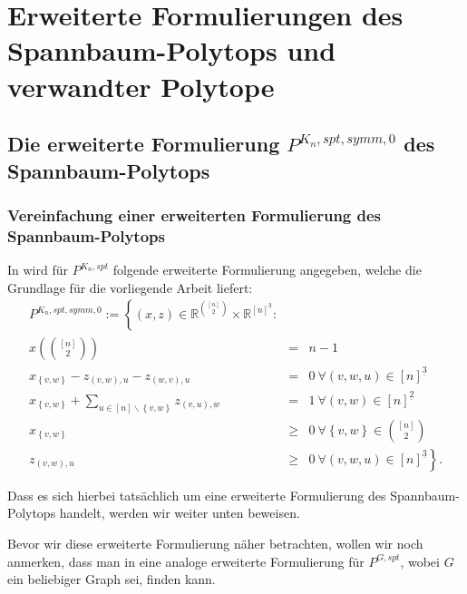\documentclass[10p,a4paper,BCOR = 12mm, DIV=15]{scrbook}
\begin{document}
\part{Erweiterte Formulierungen des Spannbaum-Polytops und verwandter Polytope}

\label{part:spannbaum_polytop}

\chapter{Die erweiterte Formulierung $P^{K_n, spt, symm, 0}$ des Spannbaum-Polytops}

\section{Vereinfachung einer erweiterten Formulierung des Spannbaum-Polytops}

In \cite{optima:ext_form_comb_opt} wird für $P^{K_n, spt}$ folgende erweiterte Formulierung angegeben, welche die Grundlage für die vorliegende Arbeit liefert:
\begin{eqnarray}
P^{K_n, spt, symm, 0} := \left\{(x, z)\in\mathbb{R}^{[n]\choose 2}\times \mathbb{R}^{[n]^{\underline{3}}}:\right. & & \nonumber \\
x\left({\left[n\right] \choose 2}\right) & = & n-1 \label{eq:spt1_redundant_1} \\
x_{\left\{v, w\right\}} - z_{\left(v, w\right), u} - z_{\left(w, v\right), u} & = & 0\ \forall \left(v, w, u\right)\in [n]^{\underline{3}} \label{eq:spt1_redundant_2} \\
x_{\left\{v, w\right\}} + \sum_{u\in[n]\backslash\left\{v, w\right\}} z_{\left(v, u\right), w} & = & 1\ \forall \left(v, w\right)\in [n]^{\underline{2}} \label{eq:spt1_3} \\
x_{\left\{v, w\right\}} & \geq & 0\ \forall \left\{v, w\right\}\in {[n] \choose 2} \nonumber \\
z_{\left(v, w\right), u} & \geq & \left. 0\ \forall \left(v, w, u\right)\in [n]^{\underline{3}} \nonumber \right\}.
\end{eqnarray}

Dass es sich hierbei tatsächlich um eine erweiterte Formulierung des Spannbaum-Polytops handelt, werden wir weiter unten beweisen.

Bevor wir diese erweiterte Formulierung näher betrachten, wollen wir noch anmerken, dass man in \cite{springerlink:ext_form_comb_opt} eine analoge erweiterte Formulierung für $P^{G, spt}$, wobei $G$ ein beliebiger Graph sei, finden kann.
\end{document}
